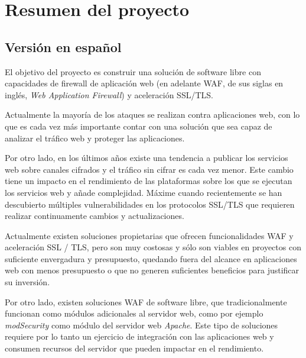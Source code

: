 \clearpage
\section{Resumen del proyecto}

\subsection{Versión en español}
\par El objetivo del proyecto es construir una solución de software libre con capacidades de firewall de aplicación web (en adelante WAF, de sus siglas en inglés, {\em Web Application Firewall}) y aceleración SSL/TLS.
\par Actualmente la mayoría de los ataques se realizan contra aplicaciones web, con lo que es cada vez más importante
contar con una solución que sea capaz de analizar el tráfico web y proteger las aplicaciones.
\par Por otro lado, en los últimos años existe una tendencia a publicar los servicios web sobre canales cifrados y el
tráfico sin cifrar es cada vez menor. Este cambio tiene un impacto en el rendimiento de las plataformas sobre los que
se ejecutan los servicios web y añade complejidad. Máxime cuando recientemente se han descubierto múltiples
vulnerabilidades en los protocolos SSL/TLS que requieren realizar continuamente cambios y actualizaciones.
\par Actualmente existen soluciones propietarias que ofrecen funcionalidades WAF y aceleración SSL / TLS, pero son muy
costosas y sólo son viables en proyectos con suficiente envergadura y presupuesto, quedando fuera del alcance en
aplicaciones web con menos presupuesto o que no generen suficientes beneficios para justificar su inversión.
\par Por otro lado, existen soluciones WAF de software libre, que tradicionalmente funcionan como módulos adicionales
al servidor web, como por ejemplo {\em modSecurity} como módulo del servidor web {\em Apache}. Este tipo de
soluciones requiere por lo tanto un ejercicio de integración con las aplicaciones web y consumen recursos del
servidor que pueden impactar en el rendimiento.
